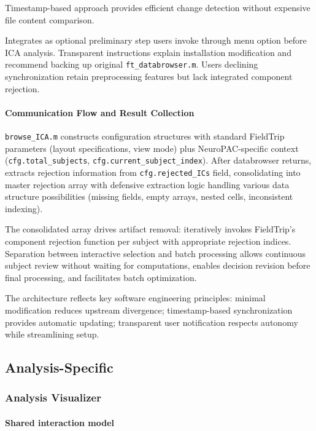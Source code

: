 \documentclass[12pt]{report}
\begin{document}
Timestamp-based approach provides efficient change detection without expensive file content comparison.

Integrates as optional preliminary step users invoke through menu option before ICA analysis. Transparent instructions explain installation modification and recommend backing up original \verb|ft_databrowser.m|. Users declining synchronization retain preprocessing features but lack integrated component rejection.

\paragraph{Communication Flow and Result Collection}\mbox{}

\verb|browse_ICA.m| constructs configuration structures with standard FieldTrip parameters (layout specifications, view mode) plus NeuroPAC-specific context (\verb|cfg.total_subjects|, \verb|cfg.current_subject_index|). After databrowser returns, extracts rejection information from \verb|cfg.rejected_ICs| field, consolidating into master rejection array with defensive extraction logic handling various data structure possibilities (missing fields, empty arrays, nested cells, inconsistent indexing).

The consolidated array drives artifact removal: iteratively invokes FieldTrip's component rejection function per subject with appropriate rejection indices. Separation between interactive selection and batch processing allows continuous subject review without waiting for computations, enables decision revision before final processing, and facilitates batch optimization.

The architecture reflects key software engineering principles: minimal modification reduces upstream divergence; timestamp-based synchronization provides automatic updating; transparent user notification respects autonomy while streamlining setup.


\subsection{Analysis-Specific}

\subsubsection{Analysis Visualizer}

\paragraph{Shared interaction model}\mbox{}
\end{document}
